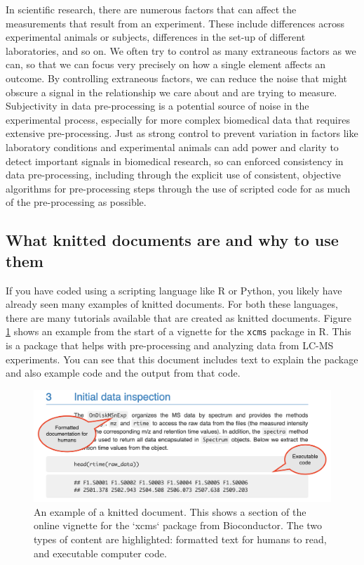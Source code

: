 \documentclass[]{tufte-book}
\begin{document}
In scientific research, there are numerous factors that can affect the
measurements that result from an experiment. These include differences across
experimental animals or subjects, differences in the set-up of different
laboratories, and so on. We often try to control as many extraneous factors as
we can, so that we can focus very precisely on how a single element affects an
outcome. By controlling extraneous factors, we can reduce the noise that might
obscure a signal in the relationship we care about and are trying to measure.
Subjectivity in data pre-processing is a potential source of noise in the
experimental process, especially for more complex biomedical data that requires
extensive pre-processing. Just as strong control to prevent variation in factors
like laboratory conditions and experimental animals can add power and clarity to
detect important signals in biomedical research, so can enforced consistency in
data pre-processing, including through the explicit use of consistent, objective
algorithms for pre-processing steps through the use of scripted code for as much
of the pre-processing as possible.

\hypertarget{what-knitted-documents-are-and-why-to-use-them}{%
\subsection{What knitted documents are and why to use them}\label{what-knitted-documents-are-and-why-to-use-them}}

If you have coded using a scripting language like R or Python, you likely have
already seen many examples of knitted documents. For both these languages, there
are many tutorials available that are created as knitted documents. Figure
\ref{fig:xcmsexample} shows an example from the start of a vignette for the
\texttt{xcms} package in R. This is a package that helps with pre-processing and
analyzing data from LC-MS experiments. You can see that this document includes
text to explain the package and also example code and the output from that code.

\begin{figure}
\includegraphics[width=\textwidth]{figures/vignette_example_annotated} \caption[An example of a knitted document]{An example of a knitted document. This shows a section of the online vignette for the `xcms` package from Bioconductor. The two types of content are highlighted: formatted text for humans to read, and executable computer code.}\label{fig:xcmsexample}
\end{figure}
\end{document}
